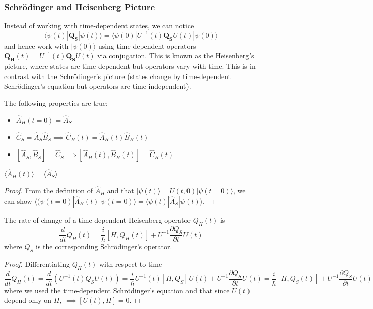 \documentclass[a4paper]{article}
\begin{document}
\subsubsection*{Schr\"{o}dinger and Heisenberg Picture}
\begin{defi}
Instead of working with time-dependent states, we can notice $$\langle\psi(t)|\mathbf{Q_S}|\psi(t)\rangle=\langle\psi(0)|U^{-1}(t)\mathbf{Q_S}U(t)|\psi(0)\rangle$$ and hence work with $|\psi(0)\rangle$ using time-dependent operators $\mathbf{Q_H}(t)=U^{-1}(t)\mathbf{Q_S}U(t)$ via conjugation. This is known as the Heisenberg's picture, where states are time-dependent but operators vary with time. This is in contrast with the Schr\"{o}dinger's picture (states change by time-dependent Schr\"{o}dinger's equation but operators are time-independent).
\end{defi}
\begin{thm}
The following properties are true:
\begin{itemize}
    \item $\hat{A}_H(t=0)=\hat{A}_S$
    \item $\hat{C}_S=\hat{A}_S\hat{B}_S\implies\hat{C}_H(t)=\hat{A}_H(t)\hat{B}_H(t)$
    \item $[\hat{A}_S,\hat{B}_S]=\hat{C}_S\implies[\hat{A}_H(t),\hat{B}_H(t)]=\hat{C}_H(t)$
\end{itemize}
\end{thm}
\begin{thm}
$\langle\hat{A}_H(t)\rangle=\langle\hat{A}_S\rangle$
\end{thm}
\begin{proof}
From the definition of $\hat{A}_H$ and that $|\psi(t)\rangle=U(t,0)|\psi(t=0)\rangle$, we can show $\langle(\psi(t=0)|\hat{A}_H(t)|\psi(t=0)\rangle=\langle\psi(t)|\hat{A}_S|\psi(t)\rangle$. 
\end{proof}
\begin{thm}
The rate of change of a time-dependent Heisenberg operator $Q_H(t)$ is
$$\frac{d}{dt}Q_H(t)=\frac{i}{\hbar}[H,Q_H(t)]+U^{-1}\frac{\partial Q_S}{\partial t}U(t)$$
where $Q_S$ is the corresponding Schr\"{o}dinger's operator.
\end{thm}
\begin{proof}
Differentiating $Q_H(t)$ with respect to time
$$\frac{d}{dt}Q_H(t)=\frac{d}{dt}(U^{-1}(t)Q_SU(t))=\frac{i}{\hbar}U^{-1}(t)[H,Q_S]U(t)+U^{-1}\frac{\partial Q_S}{\partial t}U(t)=\frac{i}{\hbar}[H,Q_S(t)]+U^{-1}\frac{\partial Q_S}{\partial t}U(t)$$
where we used the time-dependent Schr\"{o}dinger's equation and that since $U(t)$ depend only on $H$, $\implies[U(t),H]=0$.
\end{proof}
\end{document}
